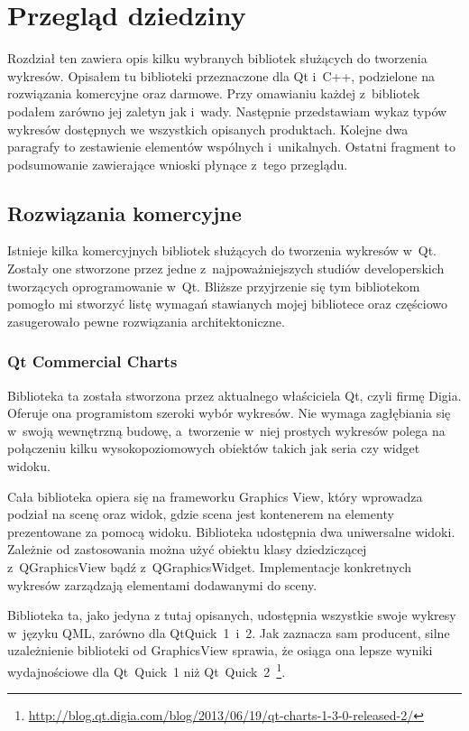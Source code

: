 \chapter{Przegląd dziedziny}\label{chap:przeglad}
Rozdział ten zawiera opis kilku wybranych bibliotek służących do tworzenia wykresów. Opisałem tu  biblioteki przeznaczone dla Qt i~C++, podzielone na rozwiązania komercyjne oraz darmowe. Przy omawianiu każdej z~bibliotek podałem zarówno jej zaletyn jak i~wady. Następnie przedstawiam wykaz typów wykresów dostępnych we wszystkich opisanych produktach. Kolejne dwa paragrafy to zestawienie elementów wspólnych i~unikalnych. Ostatni fragment to podsumowanie zawierające wnioski płynące z~tego przeglądu.

\section{Rozwiązania komercyjne}
Istnieje kilka komercyjnych bibliotek służących do tworzenia wykresów w~Qt. Zostały one stworzone przez jedne z~najpoważniejszych studiów developerskich tworzących oprogramowanie w~Qt. Bliższe przyjrzenie się tym bibliotekom pomogło mi stworzyć listę wymagań stawianych mojej bibliotece oraz częściowo zasugerowało pewne rozwiązania architektoniczne.
 
\subsection{Qt Commercial Charts}
Biblioteka ta została stworzona przez aktualnego właściciela Qt, czyli firmę Digia. Oferuje ona programistom szeroki wybór wykresów. Nie wymaga zagłębiania się w~swoją wewnętrzną budowę, a~tworzenie w~niej prostych wykresów polega na połączeniu kilku wysokopoziomowych obiektów takich jak seria czy widget widoku.\newline

Cała biblioteka opiera się na frameworku Graphics View, który wprowadza podział na scenę oraz widok, gdzie scena jest kontenerem na elementy prezentowane za pomocą widoku.
Biblioteka udostępnia dwa uniwersalne widoki. Zależnie od zastosowania można użyć obiektu klasy dziedziczącej z~QGraphicsView bądź z~QGraphicsWidget. Implementacje konkretnych wykresów zarządzają elementami dodawanymi do sceny.\newline

Biblioteka ta, jako jedyna z tutaj opisanych, udostępnia wszystkie swoje wykresy w~języku QML, zarówno dla QtQuick~1~i~2.
Jak zaznacza sam producent, silne uzależnienie biblioteki od GraphicsView sprawia, że osiąga ona lepsze wyniki wydajnościowe dla Qt~Quick~1 niż Qt~Quick~2~\footnote{\url{http://blog.qt.digia.com/blog/2013/06/19/qt-charts-1-3-0-released-2/}}.\newline

